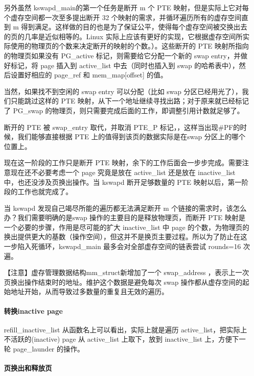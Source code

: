 另外虽然 kswapd\_main的第一个任务是断开 m 个 PTE
映射，但是实际上它对每个虚存空间都一次至多提出断开 32
个映射的需求，并循环遍历所有的虚存空间直到 m
得到满足。这样做的目的也是为了保证公平，使得每个虚存空间被交换出去的页的几率是近似相等的。Linux
实际上应该有更好的实现，它根据虚存空间所实际使用的物理页的个数来决定断开的映射的个数。）。这些断开的
PTE 映射所指向的物理页如果没有 PG\_active 标记，则需要给它分配一个新的
swap entry，并做好标记，将 page 插入到 active\_list 中去（同时也插入到
swap 的哈希表中），然后设置好相应的 page\_ref 和 mem\_map{[}offset{]}
的值。

当然，如果找不到空闲的 swap entry 可以分配（比如 swap
分区已经用光了），我们只能跳过这样的 PTE
映射，从下一个地址继续寻找出路；对于原来就已经标记了 PG\_swap
的物理页，则只需要完成后面的工作，即调整引用计数就足够了。

断开的 PTE 被 swap\_entry 取代，并取消 PTE\_P
标记，，这样当出现\#PF的时候，我们能够直接根据 PTE
上的值得到该页的数据实际是在swap 分区上的哪个位置上。

现在这一阶段的工作只是断开 PTE
映射，余下的工作后面会一步步完成。需要注意现在还不必要考虑一个 page
究竟是放在 active\_list 还是放在 inactive\_list
中，也还没涉及页换出操作。当 kswapd 断开足够数量的 PTE
映射以后，第一阶段的工作也就完成了。

当 kswapd 发现自己竭尽所能的遍历都无法满足断开 m
个链接的需求时，该怎么办？我们需要明确的是swap
操作的主要目的是释放物理页，而断开 PTE
映射是一个必要的步骤，作用是尽可能的扩大 inactive\_list 中 page
的个数，为物理页的换出提供更大的基数（操作空间），但这并不是换页主要过程。所以为了防止在这一步陷入死循环，kswapd\_main
最多会对全部虚存空间的链表尝试 rounds=16 次遍。

【注意】虚存管理数据结构mm\_struct新增加了一个 swap\_address
，表示上一次页换出操作结束时的地址。维护这个数据是避免每次 swap
操作都从虚存空间的起始地址开始，从而导致过多数量的重复且无效的遍历。

\paragraph{转换inactive page}\label{ux8f6cux6362inactive-page}

refill\_inactive\_list 从函数名上可以看出，实际上就是遍历
active\_list，把实际上不活跃的(inactive) page 从 active\_list
上取下，放到 inactive\_list 上，方便下一轮 page\_launder 的操作。

\paragraph{页换出和释放页}\label{ux9875ux6362ux51faux548cux91caux653eux9875}


